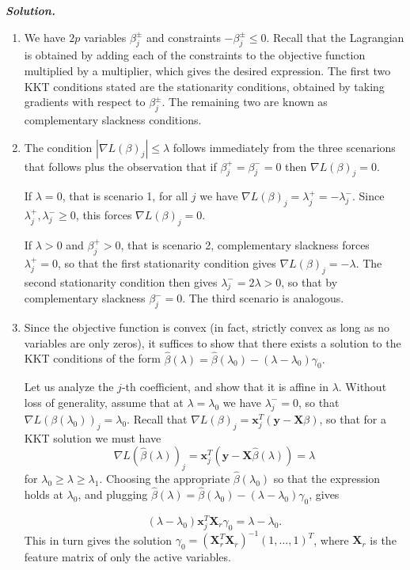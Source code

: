 \documentclass[12pt]{article}
\def\bx{\textbf{x}}
\def\bX{\textbf{X}}
\def\by{\textbf{y}}
\newenvironment{solution}[1][\it{Solution}]{\textbf{#1. } }{\vspace{.5cm}}
\begin{document}
\begin{solution}
\begin{enumerate}
\item [(a)] We have $2p$ variables $\beta_j^\pm$ and constraints $-\beta_j^\pm \leq 0$. Recall that the Lagrangian is obtained by adding each of the constraints to the objective function multiplied by a multiplier, which gives the desired expression. The first two KKT conditions stated are the stationarity conditions, obtained by taking gradients with respect to $\beta_j^\pm$. The remaining two are known as complementary slackness conditions.

\item [(b)] The condition $|\nabla L (\beta)_j| \leq \lambda$ follows immediately from the three scenarions that follows plus the observation that if $\beta_j^+ = \beta_j^- = 0$ then $\nabla L (\beta)_j = 0$. 

If $\lambda = 0$, that is scenario 1, for all $j$ we have $\nabla L(\beta)_j = \lambda_j^+ = - \lambda_j^-$. Since $\lambda_j^+, \lambda_j^- \geq0$, this forces $\nabla L(\beta)_j = 0$.

If $\lambda >0$ and $\beta_j^+ > 0$, that is scenario 2, complementary slackness forces $\lambda_j^+ = 0$, so that the first stationarity condition gives $\nabla L(\beta)_j = - \lambda$. The second stationarity condition then gives $\lambda_j^- = 2 \lambda > 0$, so that by complementary slackness $\beta_j^- = 0$. The third scenario is analogous.

\item [(c)] Since the objective function is convex (in fact, strictly convex as long as no variables are only zeros), it suffices to show that there exists a solution to the KKT conditions of the form $ \hat{\beta}(\lambda) = \hat{\beta}(\lambda_0) - (\lambda-\lambda_0)\gamma_0.$ 

Let us analyze the $j$-th coefficient, and show that it is affine  in $\lambda$. Without loss of generality, assume that at $\lambda = \lambda_0$ we have $\lambda_j^- = 0$, so that $\nabla L(\beta(\lambda_0))_j = \lambda_0$.  Recall that $\nabla L(\beta)_j = \bx_j^T(\by - \bX \beta)$, so that for a KKT solution we must have 
$$\nabla L(\hat{\beta}(\lambda))_j = \bx_j^T(\by - \bX \hat{\beta}(\lambda)) = \lambda$$ 
for $\lambda_0 \geq \lambda \geq \lambda_1$. Choosing the appropriate $\hat{\beta}(\lambda_0)$ so that the expression holds at $\lambda_0$, and plugging $ \hat{\beta}(\lambda) = \hat{\beta}(\lambda_0) - (\lambda-\lambda_0)\gamma_0$, gives 

$$(\lambda-\lambda_0) \bx_j^T\bX_r \gamma_0 = \lambda - \lambda_0. $$
This in turn gives the solution $\gamma_0 = (\bX_r^T \bX_r)^{-1}(1, \dots, 1)^T$, where $\bX_r$ is the feature matrix of only the active variables.
\end{enumerate}
\end{solution}
\end{document}
